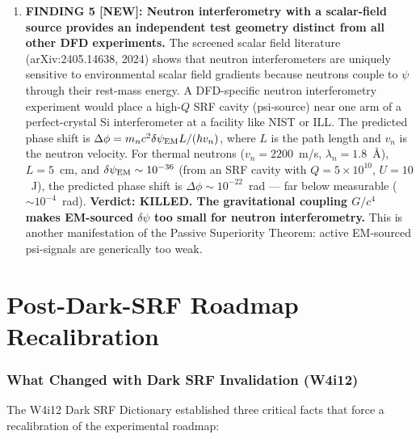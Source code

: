 \documentclass[11pt]{article}
\newcommand{\ee}[1]{\times 10^{#1}}
\newcommand{\dpsi}{\delta\psi}
\begin{document}
\begin{tcolorbox}[colback=blue!5!white, colframe=blue!60!black,
  title=\textbf{W4i13 TOP 5 FINDINGS --- Ranked by Programme Impact}]
\begin{enumerate}
\item \textbf{FINDING 5 [NEW]: Neutron interferometry with a scalar-field
source provides an independent test geometry distinct from all other
DFD experiments.}
The screened scalar field literature (arXiv:2405.14638, 2024) shows
that neutron interferometers are uniquely sensitive to environmental
scalar field gradients because neutrons couple to $\psi$ through their
rest-mass energy. A DFD-specific neutron interferometry experiment
would place a high-$Q$ SRF cavity (psi-source) near one arm of a
perfect-crystal Si interferometer at a facility like NIST or ILL.
The predicted phase shift is
$\Delta\phi = m_n c^2 \dpsi_{\rm EM} L / (\hbar v_n)$, where $L$
is the path length and $v_n$ is the neutron velocity. For thermal
neutrons ($v_n = 2200$~m/s, $\lambda_n = 1.8$~\AA), $L = 5$~cm, and
$\dpsi_{\rm EM} \sim 10^{-36}$ (from an SRF cavity with $Q = 5\ee{10}$,
$U = 10$~J), the predicted phase shift is
$\Delta\phi \sim 10^{-22}$~rad --- far below measurable ($\sim 10^{-4}$~rad).
\textbf{Verdict: KILLED. The gravitational coupling $G/c^4$ makes
EM-sourced $\dpsi$ too small for neutron interferometry.} This is
another manifestation of the Passive Superiority Theorem: active
EM-sourced psi-signals are generically too weak.

\end{enumerate}
\end{tcolorbox}

\tableofcontents
\newpage


\part{Post-Dark-SRF Roadmap Recalibration}
\label{part:roadmap}

\section{What Changed with Dark SRF Invalidation (W4i12)}

The W4i12 Dark SRF Dictionary established three critical facts that
force a recalibration of the experimental roadmap:
\end{document}
